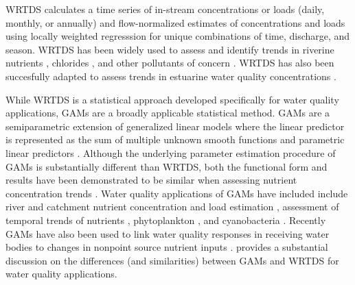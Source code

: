 \documentclass[sn-basic,referee,lineno,pdflatex]{sn-jnl}
\begin{document}
WRTDS calculates a time series of in-stream concentrations or loads
(daily, monthly, or annually) and flow-normalized estimates of
concentrations and loads using locally weighted regresssion for unique
combinations of time, discharge, and season. WRTDS has been widely used
to assess and identify trends in riverine nutrients
\citep{oelsner_recent_2019, stackpooleLongTermMississippi2021},
chlorides \citep{stetsIncreasingChlorideRivers2018}, and other
pollutants of concern \citep{shodaWaterqualityTrendsRivers2019}. WRTDS
has also been succesfully adapted to assess trends in estuarine water
quality concentrations \citep{beckFourDecadesWater2018}.

While WRTDS is a statistical approach developed specifically for water
quality applications, GAMs are a broadly applicable statistical method.
GAMs are a semiparametric extension of generalized linear models where
the linear predictor is represented as the sum of multiple unknown
smooth functions and parametric linear predictors
\citep{woodFastStableRestricted2011}. Although the underlying parameter
estimation procedure of GAMs is substantially different than WRTDS, both
the functional form and results have been demonstrated to be similar
when assessing nutrient concentration trends
\citep{beckNumericalQualitativeContrasts2017}. Water quality
applications of GAMs have included include river and catchment nutrient
concentration and load estimation
\citep{wangLoadEstimationUncertainties2011, kroonRiverLoadsSuspended2012, kuhnertQuantifyingTotalSuspended2012, robson_prediction_2015-1, hagemannEstimatingNutrientOrganic2016, mcdowell_implications_2021, biagi_novel_2022},
assessment of temporal trends of nutrients
\citep{beckNumericalQualitativeContrasts2017, murphyGeneralizedAdditiveModel2019},
phytoplankton \citep{bergbuschUnexpectedShiftPhytoplankton2021}, and
cyanobacteria \citep{hayesEffectsLakeWarming2020}. Recently GAMs have
also been used to link water quality responses in receiving water bodies
to changes in nonpoint source nutrient inputs
\citep{murphyNutrientImprovementsChesapeake2022}.
\citet{beckNumericalQualitativeContrasts2017} provides a substantial
discussion on the differences (and similarities) between GAMs and WRTDS
for water quality applications.
\end{document}
